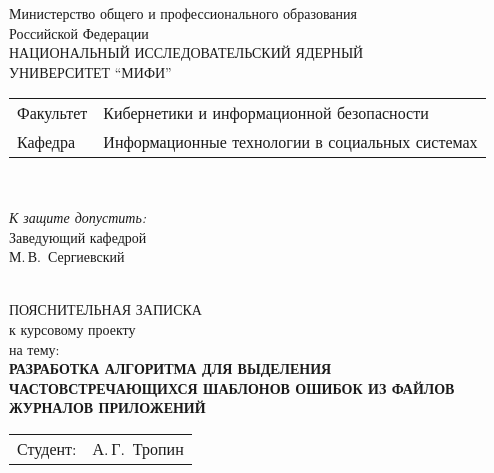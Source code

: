 \begin{titlepage}
  \begin{center}
    Министерство общего и профессионального образования\\
    Российской Федерации \\[1em]

    НАЦИОНАЛЬНЫЙ ИССЛЕДОВАТЕЛЬСКИЙ ЯДЕРНЫЙ\\
    УНИВЕРСИТЕТ ``МИФИ'' \\[1em]

    \begin{minipage}{\textwidth}
      \begin{flushleft}
        \begin{tabular}{ l l }
          Факультет & Кибернетики и информационной безопасности\\
          Кафедра   & Информационные технологии в социальных системах
        \end{tabular}
      \end{flushleft}
    \end{minipage}\\[1em]

    \begin{minipage}{\textwidth}
      \begin{flushright}
        \textit{К защите допустить:}\\
        Заведующий кафедрой\\
        \underline{\hspace*{4.5cm}} М.\,В.~Сергиевский
      \end{flushright}
    \end{minipage}\\[3em]

    {ПОЯСНИТЕЛЬНАЯ ЗАПИСКА}\\
    {к курсовому проекту}\\
    {на тему:}\\[1em]
    \textbf{РАЗРАБОТКА АЛГОРИТМА ДЛЯ ВЫДЕЛЕНИЯ ЧАСТОВСТРЕЧАЮЩИХСЯ ШАБЛОНОВ
      ОШИБОК ИЗ ФАЙЛОВ ЖУРНАЛОВ ПРИЛОЖЕНИЙ}\\[1em]


    \vfill

    \begin{tabular}{ p{}p{} }

      Студент: & А.\,Г.~Тропин \\


\end{tabular}
\end{center}
\end{titlepage}
